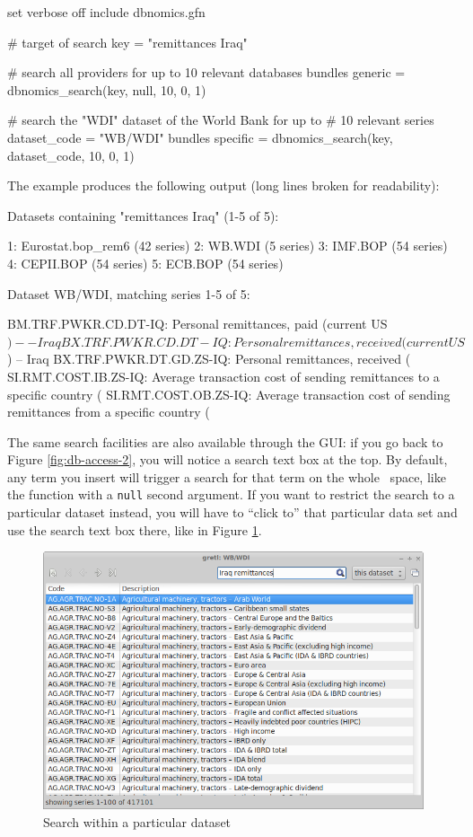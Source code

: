 \documentclass{article}
\begin{document}
\begin{code}
set verbose off
include dbnomics.gfn

# target of search
key = "remittances Iraq"

# search all providers for up to 10 relevant databases
bundles generic = dbnomics_search(key, null, 10, 0, 1)

# search the "WDI" dataset of the World Bank for up to
# 10 relevant series
dataset_code = "WB/WDI"
bundles specific = dbnomics_search(key, dataset_code, 10, 0, 1)
\end{code}

The example produces the following output (long lines broken for
readability):

\begin{code}
Datasets containing "remittances Iraq" (1-5 of 5):

  1: Eurostat.bop_rem6 (42 series)
  2: WB.WDI (5 series)
  3: IMF.BOP (54 series)
  4: CEPII.BOP (54 series)
  5: ECB.BOP (54 series)

Dataset WB/WDI, matching series 1-5 of 5:

BM.TRF.PWKR.CD.DT-IQ: Personal remittances, paid (current US$) -- Iraq
BX.TRF.PWKR.CD.DT-IQ: Personal remittances, received (current US$) -- Iraq
BX.TRF.PWKR.DT.GD.ZS-IQ: Personal remittances, received (%
SI.RMT.COST.IB.ZS-IQ: Average transaction cost of sending remittances
  to a specific country (%
SI.RMT.COST.OB.ZS-IQ: Average transaction cost of sending remittances
  from a specific country (%
\end{code}

The same search facilities are also available through the GUI: if you
go back to Figure \ref{fig:db-access-2}, you will notice a search text
box at the top. By default, any term you insert will trigger a search
for that term on the whole \DB\ space, like the 
function with a \texttt{null} second argument. If you want to restrict
the search to a particular dataset instead, you will have to ``click
to'' that particular data set and use the search text box there, like
in Figure \ref{fig:db-access-3}.

\begin{figure}[htbp]
  \centering
  \includegraphics[scale=0.5]{db-access-3}
  \caption{Search within a particular dataset}
  \label{fig:db-access-3}
\end{figure}
\end{document}
